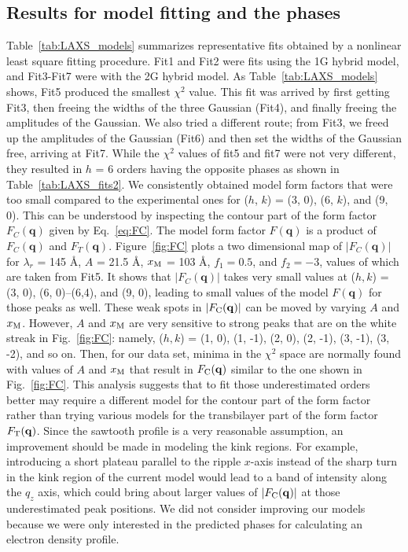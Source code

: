 \subsection{Results for model fitting and the phases}\label{sec:LAXS_model_results}
Table~\ref{tab:LAXS_models} summarizes representative fits obtained by a nonlinear
least square fitting procedure. Fit1 and Fit2 were fits using the 1G hybrid model,
and Fit3-Fit7 were with the 2G hybrid model. As Table~\ref{tab:LAXS_models} shows, 
Fit5 produced the smallest $\chi^2$ value. This fit was arrived by first getting 
Fit3, then freeing the widths of the three Gaussian (Fit4), 
and finally freeing the amplitudes of the Gaussian.
We also tried a different route; from Fit3, we freed up the amplitudes of 
the Gaussian (Fit6) and then set the widths of the Gaussian free, arriving 
at Fit7. While the $\chi^2$ values of fit5 and fit7 were not very different,
they resulted in $h$ = 6 orders having the opposite phases as shown in 
Table~\ref{tab:LAXS_fits2}. We consistently obtained model
form factors that were too small compared to the experimental ones 
for ($h$, $k$) = (3, 0), (6, $k$), and (9, 0). This can be understood by
inspecting the contour part of the form factor $F_C(\mathbf{q})$ 
given by Eq.~\ref{eq:FC}.
The model form factor $F(\mathbf{q})$ is a product of
$F_C(\mathbf{q})$ and $F_T(\mathbf{q})$.
Figure~\ref{fig:FC} plots a two dimensional map of $|F_C(\mathbf{q})|$ for
$\lambda_r$ = 145 \AA, $A$ = 21.5 \AA, $x_\textrm{M}$ = 103 \AA, $f_1=0.5$,
and $f_2=-3$, values of which are taken from Fit5.
It shows that $|F_C(\mathbf{q})|$ takes very small values at 
($h, k$) = (3, 0), (6, 0)--(6,4), and (9, 0), leading to small values of
the model $F(\mathbf{q})$ for those peaks as well. These weak spots in $|F_\mathrm{C}(\mathbf{q})|$
can be moved by varying $A$ and $x_\textrm{M}$. However, $A$ and $x_\textrm{M}$ are very 
sensitive to strong peaks that are on the white streak in Fig.~\ref{fig:FC}:
namely, ($h, k$) = (1, 0), (1, -1), (2, 0), (2, -1), (3, -1), (3, -2), and so on.
Then, for our data set, minima in the $\chi^2$ space are normally found
with values of $A$ and $x_\textrm{M}$ that result in $F_\mathrm{C}(\mathbf{q})$ similar to the 
one shown in Fig.~\ref{fig:FC}.
This analysis
suggests that to fit those underestimated orders better may require a different model
for the contour part of the form factor rather than trying various
models for the transbilayer part of the form factor $F_\mathrm{T}(\mathbf{q})$. 
Since the sawtooth profile is a very reasonable assumption, an improvement
should be made in modeling the kink regions.
For example, introducing a short plateau parallel to the ripple $x$-axis
instead of the sharp turn in the kink region of the current model would
lead to a band of intensity along the $q_z$ axis, which could bring about 
larger values of $|F_\mathrm{C}(\mathbf{q})|$ at those underestimated peak positions.
We did not consider
improving our models because we were only interested in the predicted
phases for calculating an electron density profile.

